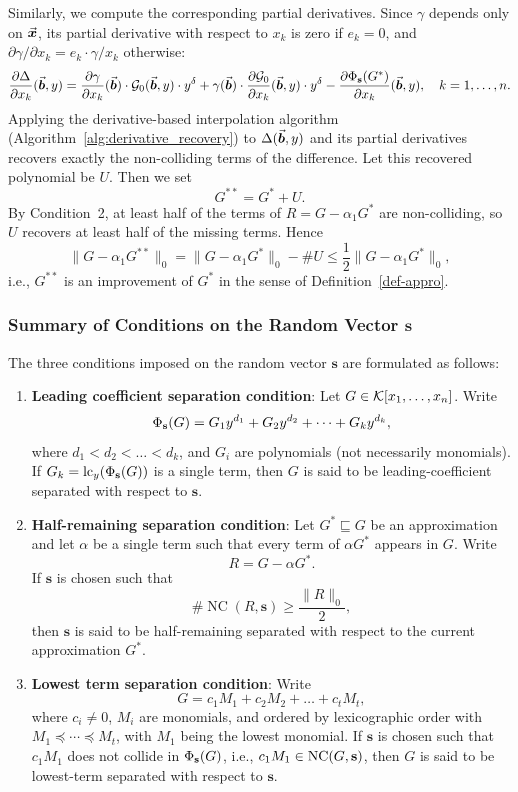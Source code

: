 \documentclass{article}
\numberwithin{equation}{section}
\begin{document}
Similarly, we compute the corresponding partial derivatives. Since $\gamma$ depends only on $\vec{\boldsymbol{x}}$, its partial derivative with respect to $x_k$ is zero if $e_k = 0$, and $\partial \gamma/\partial x_k = e_k \cdot \gamma / x_k$ otherwise:
\[
\frac{\partial \Delta}{\partial x_k}(\vec{\boldsymbol{b}}, y)
=
\frac{\partial \gamma}{\partial x_k}(\vec{\boldsymbol{b}}) \cdot \mathcal{G}_0(\vec{\boldsymbol{b}}, y) \cdot y^{\delta}
+ \gamma(\vec{\boldsymbol{b}}) \cdot \frac{\partial \mathcal{G}_0}{\partial x_k}(\vec{\boldsymbol{b}}, y) \cdot y^{\delta}
- \frac{\partial \Phi_{\mathbf{s}}(G^*)}{\partial x_k}(\vec{\boldsymbol{b}}, y),
\quad k = 1,\dots,n.
\]
Applying the derivative-based interpolation algorithm (Algorithm~\ref{alg:derivative_recovery}) to $\Delta(\vec{\boldsymbol{b}}, y)$ and its partial derivatives recovers exactly the non-colliding terms of the difference. Let this recovered polynomial be $U$. Then we set
\[
G^{**} = G^* + U.
\]
By Condition~2, at least half of the terms of $R = G - \alpha_1 G^*$ are non-colliding, so $U$ recovers at least half of the missing terms. Hence
\[
\|G - \alpha_1 G^{**}\|_0 = \|G - \alpha_1 G^*\|_0 - \#U \le \frac{1}{2} \|G - \alpha_1 G^*\|_0,
\]
i.e., $G^{**}$ is an improvement of $G^*$ in the sense of Definition~\ref{def-appro}.




\subsubsection*{Summary of Conditions on the Random Vector $\mathbf{s}$}\label{sec-condition}

The three conditions imposed on the random vector $\mathbf{s}$ are formulated as follows:

\begin{enumerate}
    \item \textbf{Leading coefficient separation condition}: Let $G \in {\mathcal{K}}[x_1,\dots,x_n]$. Write
\[
\Phi_{\mathbf{s}}(G) = G_1 y^{d_1} + G_2 y^{d_2} + \dots + G_k y^{d_k},
\]
where $d_1 < d_2 < \dots < d_k$, and $G_i$ are polynomials (not necessarily monomials). If $G_k=\operatorname{lc}_y(\Phi_{\mathbf{s}}(G))$ is a single term, then $G$ is said to be leading-coefficient separated with respect to $\mathbf{s}$.

   \item \textbf{Half-remaining separation condition}: Let $G^* \sqsubseteq G$ be an approximation and let $\alpha$ be a single term such that every term of $\alpha G^*$ appears in $G$. Write
\[
R = G - \alpha G^*.
\]
If $\mathbf{s}$ is chosen such that
\[
\#\operatorname{NC}(R, \mathbf{s}) \ge \frac{\|R\|_0}{2},
\]
then $\mathbf{s}$ is said to be half-remaining separated with respect to the current approximation $G^*$.


    \item \textbf{Lowest term separation condition}: Write
\[
G = c_1 M_1 + c_2 M_2 + \dots + c_t M_t,
\]
where $c_i \neq 0$, $M_i$ are monomials, and ordered by  lexicographic order with $M_1 \preceq \cdots \preceq M_t$, with $M_1$ being the lowest monomial. If $\mathbf{s}$ is chosen such that $c_1 M_1$ does not collide in $\Phi_{\mathbf{s}}(G)$, i.e., $c_1 M_1 \in {\rm NC}(G,\mathbf{s})$, then $G$ is said to be lowest-term separated with respect to $\mathbf{s}$.
 
\end{enumerate}
\end{document}
